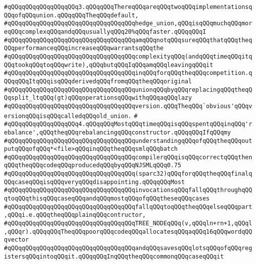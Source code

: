 \verb|#qQQqqQQqqQQqqQQqqQQq3.qQQqqQQqThereqQQqareqQQqtwoqQQqimplementationsqQQqofqQQqunion.qQQqqQQqTheqQQqdefault,|\newline
\verb|#qQQqqQQqqQQqqQQqqQQqqQQqqQQqqQQqqQQqhedge_union,qQQqisqQQqmuchqQQqmoreqQQqcomplexqQQqandqQQqusuallyqQQq20%qQQqfaster.qQQqqQQqI|\newline
\verb|#qQQqqQQqqQQqqQQqqQQqqQQqqQQqqQQqqQQqamqQQqnotqQQqsureqQQqthatqQQqtheqQQqperformanceqQQqincreaseqQQqwarrantsqQQqthe|\newline
\verb|#qQQqqQQqqQQqqQQqqQQqqQQqqQQqqQQqqQQqcomplexityqQQq(andqQQqtimeqQQqitqQQqtookqQQqtoqQQqwrite),qQQqbutqQQqIqQQqamqQQqleavingqQQqit|\newline
\verb|#qQQqqQQqqQQqqQQqqQQqqQQqqQQqqQQqqQQqinqQQqforqQQqtheqQQqcompetition.qQQqqQQqItqQQqisqQQqderivedqQQqfromqQQqtheqQQqoriginal|\newline
\verb|#qQQqqQQqqQQqqQQqqQQqqQQqqQQqqQQqqQQqunionqQQqbyqQQqreplacingqQQqtheqQQqsplit_ltqQQq(gt)qQQqoperationsqQQqwithqQQqaqQQqlazy|\newline
\verb|#qQQqqQQqqQQqqQQqqQQqqQQqqQQqqQQqqQQqversion.qQQqTheqQQq`obvious'qQQqversionqQQqisqQQqcalledqQQqold_union.|\newline
\verb|#|\newline
\verb|#qQQqqQQqqQQqqQQqqQQq4.qQQqqQQqMostqQQqtimeqQQqisqQQqspentqQQqinqQQq'rebalance',qQQqtheqQQqrebalancingqQQqconstructor.qQQqqQQqIfqQQqmy|\newline
\verb|#qQQqqQQqqQQqqQQqqQQqqQQqqQQqqQQqqQQqunderstandingqQQqofqQQqtheqQQqoutputqQQqofqQQq*<file>qQQqinqQQqtheqQQqsmlqQQqbatch|\newline
\verb|#qQQqqQQqqQQqqQQqqQQqqQQqqQQqqQQqqQQqcompilerqQQqisqQQqcorrectqQQqthenqQQqtheqQQqcodeqQQqproducedqQQqbyqQQqNJSMLqQQq0.75|\newline
\verb|#qQQqqQQqqQQqqQQqqQQqqQQqqQQqqQQqqQQq(sparc32)qQQqforqQQqtheqQQqfinalqQQqcaseqQQqisqQQqveryqQQqdisappointing.qQQqqQQqMost|\newline
\verb|#qQQqqQQqqQQqqQQqqQQqqQQqqQQqqQQqqQQqinvocationsqQQqfallqQQqthroughqQQqtoqQQqthisqQQqcaseqQQqandqQQqmostqQQqofqQQqtheseqQQqcases|\newline
\verb|#qQQqqQQqqQQqqQQqqQQqqQQqqQQqqQQqqQQqfallqQQqtoqQQqtheqQQqelseqQQqpart,qQQqi.e.qQQqtheqQQqplainqQQqcontructor,|\newline
\verb|#qQQqqQQqqQQqqQQqqQQqqQQqqQQqqQQqqQQqTREE_NODEqQQq(v,qQQqln+rn+1,qQQql,qQQqr).qQQqqQQqTheqQQqpoorqQQqcodeqQQqallocatesqQQqaqQQq16qQQqwordqQQqvector|\newline
\verb|#qQQqqQQqqQQqqQQqqQQqqQQqqQQqqQQqqQQqandqQQqsavesqQQqlotsqQQqofqQQqregistersqQQqintoqQQqit.qQQqqQQqInqQQqtheqQQqcommonqQQqcaseqQQqit|\newline
